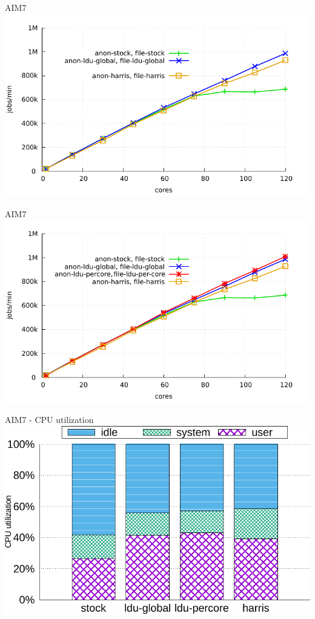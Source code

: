 \documentclass[english]{beamer} %
\begin{document}
\begin{frame}{AIM7}
\includegraphics[scale=0.8]{graph/aim7_1}
\end{frame}

\begin{frame}{AIM7}
\includegraphics[scale=0.8]{graph/aim7_2}
\end{frame}


\begin{frame}{AIM7 - CPU utilization}
\includegraphics[scale=0.8]{graph/aim7_cpuutils}
\end{frame}
\end{document}
